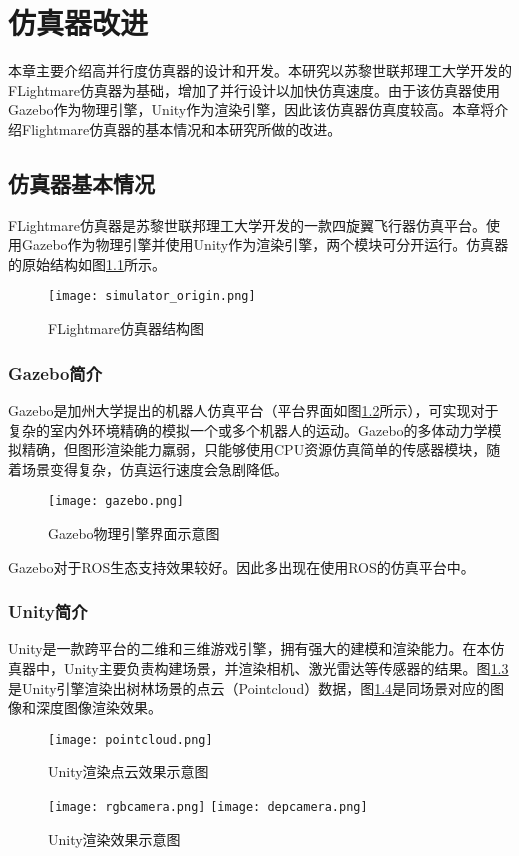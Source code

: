 
\chapter{仿真器改进}
本章主要介绍高并行度仿真器的设计和开发。本研究以苏黎世联邦理工大学开发的FLightmare\cite{flightmare}仿真器为基础，增加了并行设计以加快仿真速度。由于该仿真器使用Gazebo作为物理引擎，Unity作为渲染引擎，因此该仿真器仿真度较高。本章将介绍Flightmare仿真器的基本情况和本研究所做的改进。

\section{仿真器基本情况}
FLightmare仿真器\cite{flightmare}是苏黎世联邦理工大学开发的一款四旋翼飞行器仿真平台。使用Gazebo作为物理引擎并使用Unity作为渲染引擎，两个模块可分开运行。仿真器的原始结构如图\ref{fig_simulator_origin}所示。
\begin{figure}
  \centering
  \texttt{[image: simulator\_origin.png]}
  \caption{FLightmare仿真器结构图}
  \label{fig_simulator_origin}
\end{figure}

\subsection{Gazebo简介}
Gazebo是加州大学提出的机器人仿真平台（平台界面如图\ref{fig_gazebo}所示），可实现对于复杂的室内外环境精确的模拟一个或多个机器人的运动。Gazebo的多体动力学模拟精确，但图形渲染能力羸弱，只能够使用CPU资源仿真简单的传感器模块，随着场景变得复杂，仿真运行速度会急剧降低。
\begin{figure}
  \centering
  \texttt{[image: gazebo.png]}
  \caption{Gazebo物理引擎界面示意图}
  \label{fig_gazebo}
\end{figure}
Gazebo对于ROS生态支持效果较好。因此多出现在使用ROS的仿真平台中。

\subsection{Unity简介}
Unity是一款跨平台的二维和三维游戏引擎\cite{unity}，拥有强大的建模和渲染能力。在本仿真器中，Unity主要负责构建场景，并渲染相机、激光雷达等传感器的结果。图\ref{fig_pointcloud}是Unity引擎渲染出树林场景的点云（Pointcloud）数据，图\ref{fig_camera}是同场景对应的图像和深度图像渲染效果。
\begin{figure}
  \centering
  \texttt{[image: pointcloud.png]}
  \caption{Unity渲染点云效果示意图}
  \label{fig_pointcloud}
\end{figure}
\begin{figure}
  \centering  
    {\texttt{[image: rgbcamera.png]}}
    {\texttt{[image: depcamera.png]}}
  \caption{Unity渲染效果示意图}
  \label{fig_camera}
\end{figure}

